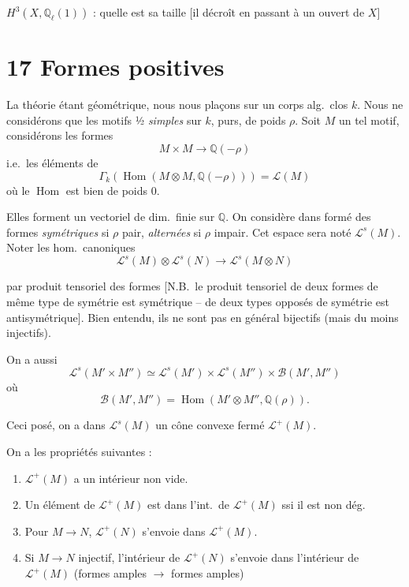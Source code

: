 \documentclass[11pt,a4paper]{article}
\begin{document}
$H^{3}(X, \mathbb{Q}_{\ell}(1))$ : quelle est sa taille [il décroît en
passant à un ouvert de $X$]

\section{17 Formes positives}

La théorie étant géométrique, nous nous plaçons sur un corps alg.\ clos
$k$. Nous ne considérons que les motifs ½ \emph{simples} sur $k$,
purs, de poids $\rho$. Soit $M$ un tel motif, considérons les
formes
\[
  M \times M \longrightarrow \mathbb{Q}(-\rho)
\]
i.e.\ les éléments de
\[
  \Gamma_{k}(\operatorname{Hom}(M \otimes M, \mathbb{Q}(-\rho))) = \mathcal{L}(M)
\]
où le \struck{\ill{}} $\operatorname{Hom}$ est bien de poids $0$.

Elles forment un vectoriel de  dim.\ finie sur
$\mathbb{Q}$. On considère  \ill{} dans
formé des formes \emph{symétriques} si $\rho$ pair, \emph{alternées} si $\rho$
impair. Cet espace sera noté $\mathcal{L}^{s}(M)$. Noter les
hom.\ canoniques
\[
  \mathcal{L}^{s}(M) \otimes \mathcal{L}^{s}(N) \longrightarrow \mathcal{L}^{s}(M \otimes N)
\]

par produit tensoriel des formes [N.B.\ le produit tensoriel de deux formes
 de même type de symétrie est symétrique -- de deux
types opposés de symétrie est antisymétrique]. Bien entendu, ils ne sont pas
en général bijectifs (mais du moins injectifs).

On a aussi
\[
  \mathcal{L}^{s}(M' \times M'') \simeq \mathcal{L}^{s}(M') \times \mathcal{L}^{s}(M'') \times \mathcal{B}(M', M'')
\]
où
\[
  \mathcal{B}(M', M'') = \operatorname{Hom}(M' \otimes M'', \mathbb{Q}(\rho)) .
\]

Ceci posé, on \struck{\ill{}} a dans $\mathcal{L}^{s}(M)$ un cône
convexe fermé $\mathcal{L}^{+}(M)$.

On a les propriétés suivantes :

\begin{enumerate}
  \item[(i)] $\mathcal{L}^{+}(M)$ a un intérieur non vide.
  \item[(ii)] Un élément de $\mathcal{L}^{+}(M)$ est dans l'int.\ de
  $\mathcal{L}^{+}(M)$ ssi il est non dég.
  \item[(iii)] Pour $M \to N$, $\mathcal{L}^{+}(N)$ s'envoie dans
  $\mathcal{L}^{+}(M)$.
  \item[(iv)] \struck{\ill{}} Si $M \to N$ injectif, 
  l'intérieur de $\mathcal{L}^{+}(N)$ s'envoie dans l'intérieur de
  $\mathcal{L}^{+}(M)$ (formes amples $\longrightarrow$ formes amples)
\end{enumerate}
\end{document}

